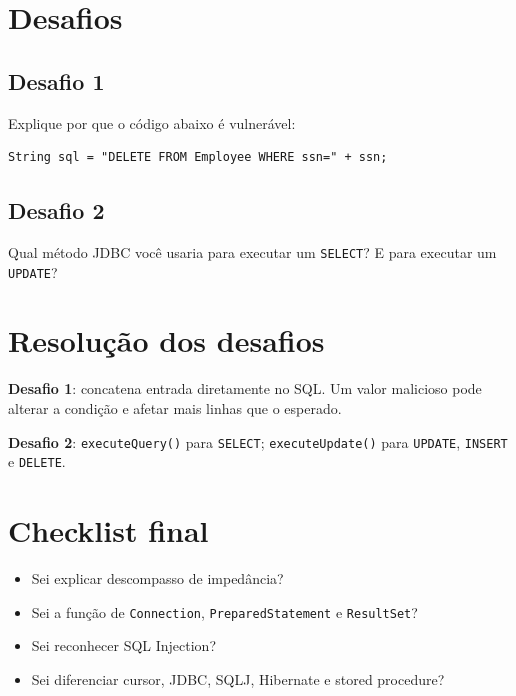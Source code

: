\documentclass[12pt,a4paper]{article}
\begin{document}
\section{Desafios}
\subsection*{Desafio 1}
Explique por que o código abaixo é vulnerável:
\begin{verbatim}
String sql = "DELETE FROM Employee WHERE ssn=" + ssn;
\end{verbatim}

\subsection*{Desafio 2}
Qual método JDBC você usaria para executar um \texttt{SELECT}? E para executar um \texttt{UPDATE}?

\section{Resolução dos desafios}
\textbf{Desafio 1}: concatena entrada diretamente no SQL. Um valor malicioso pode alterar a condição e afetar mais linhas que o esperado.

\textbf{Desafio 2}: \texttt{executeQuery()} para \texttt{SELECT}; \texttt{executeUpdate()} para \texttt{UPDATE}, \texttt{INSERT} e \texttt{DELETE}.

\section{Checklist final}
\begin{itemize}
    \item Sei explicar descompasso de impedância?
    \item Sei a função de \texttt{Connection}, \texttt{PreparedStatement} e \texttt{ResultSet}?
    \item Sei reconhecer SQL Injection?
    \item Sei diferenciar cursor, JDBC, SQLJ, Hibernate e stored procedure?
\end{itemize}
\end{document}
